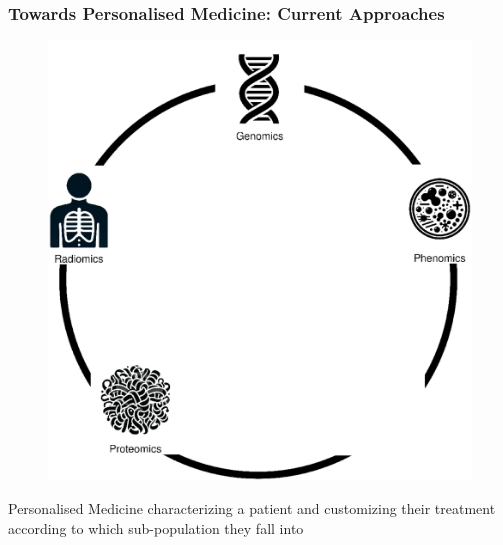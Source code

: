 \documentclass[compress]{beamer}
\begin{document}
\begin{frame}
	\frametitle{Towards Personalised Medicine: Current Approaches}
	\begin{minipage}{0.59\textwidth}
		\begin{figure}[H]
			\includegraphics[width=\textwidth]{images/approaches_current.eps}
		\end{figure}
	\end{minipage} 
	\begin{minipage}{0.39\textwidth}
		\begin{minipage}[t][0.41\paperheight][t]{\textwidth}
			\begin{block}{Personalised Medicine}
				characterizing a patient and customizing their treatment according to which sub-population they fall into	
			\end{block}
		\end{minipage}
		\begin{minipage}[t][0.41\paperheight][t]{\textwidth}
		\end{minipage}
	\end{minipage}
\end{frame}
\end{document}

